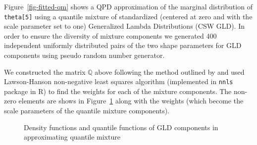 \documentclass[
  fleqn,
  deca,
  blindrev
]{informs4}
\begin{document}
Figure~\ref{fig-fitted-qm} shows a QPD approximation of the marginal
distribution of \texttt{theta{[}5{]}} using a quantile mixture of
standardized (centered at zero and with the scale parameter set to one)
\citet{chalabi2012FlexibleDistributionModeling} Generalized Lambda
Distributions (CSW GLD). In order to ensure the diversity of mixture
components we generated 400 independent uniformly distributed pairs of
the two shape parameters for GLD components using
\citet{hubbard2019MultiDimensionalCounterBasedPseudo} pseudo random
number generator.

We constructed the matrix \(\mathbb Q\) above following the method
outlined by \citet{peng2023MixtureQuantilesEstimated} and used
Lawson-Hanson non-negative least squares algorithm (implemented in
\texttt{nnls} package \citep{mullen2023NnlsLawsonhansonAlgorithm} in R)
to find the weights for each of the mixture components. The non-zero
elements are shows in Figure~\ref{fig-gld-comp} along with the weights
(which become the scale parameters of the quantile mixture components).

\begin{figure}


\caption{\label{fig-gld-comp}Density functions and quantile functions of
GLD components in approximating quantile mixture}

\end{figure}%
\end{document}
